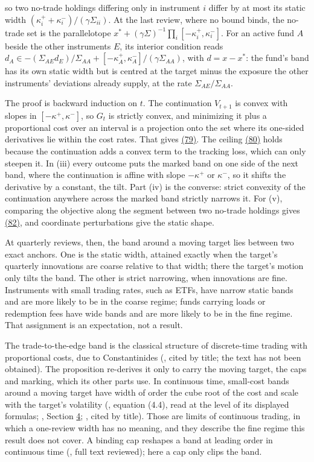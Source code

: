 \documentclass[11pt]{article}
\begin{document}
so two no-trade holdings differing only in instrument \(i\) differ by
at most its static width \((\kappa^+_i+\kappa^-_i)/(\gamma\Sigma_{ii})\). At the
last review, where no bound binds, the no-trade set is the
parallelotope \(x^*+(\gamma\Sigma)^{-1}\prod_i[-\kappa^+_i,\kappa^-_i]\). For an
active fund \(A\) beside the other instruments \(E\), its interior
condition reads
\(d_A\in-(\Sigma_{AE}d_E)/\Sigma_{AA}+[-\kappa^+_A,\kappa^-_A]/(\gamma\Sigma_{AA})\),
with \(d=x-x^*\): the fund's band has its own static width but is
centred at the target minus the exposure the other instruments'
deviations already supply, at the rate \(\Sigma_{AE}/\Sigma_{AA}\).

The proof is backward induction on \(t\). The continuation
\(V_{t+1}\) is convex with slopes in \([-\kappa^+,\kappa^-]\), so \(G_t\) is
strictly convex, and minimizing it plus a proportional cost over an
interval is a projection onto the set where its one-sided
derivatives lie within the cost rates. That gives \hyperref[eq:79]{(79)}. The ceiling
\hyperref[eq:80]{(80)} holds because the continuation adds a convex term to the
tracking loss, which can only steepen it. In (iii) every outcome puts
the marked band on one side of the next band, where the continuation
is affine with slope \(-\kappa^+\) or \(\kappa^-\), so it shifts the
derivative by a constant, the tilt. Part (iv) is the converse: strict
convexity of the continuation anywhere across the marked band
strictly narrows it. For (v), comparing the objective along the
segment between two no-trade holdings gives \hyperref[eq:82]{(82)}, and coordinate
perturbations give the static shape.

At quarterly reviews, then, the band around a moving target lies
between two exact anchors. One is the static width, attained exactly
when the target's quarterly innovations are coarse relative to that
width; there the target's motion only tilts the band. The other is
strict narrowing, when innovations are fine. Instruments with small
trading rates, such as ETFs, have narrow static bands and are more
likely to be in the coarse regime; funds carrying loads or
redemption fees have wide bands and are more likely to be in the
fine regime. That assignment is an expectation, not a result.

The trade-to-the-edge band is the classical structure of
discrete-time trading with proportional costs, due to Constantinides
(\cite{constantinides1979multiperiod}, cited by title; the text has not
been obtained). The proposition re-derives it only to carry the
moving target, the caps and marking, which its other parts use. In
continuous time, small-cost bands around a moving target have width
of order the cube root of the cost and scale with the target's
volatility (\cite{soner2013homogenization}, equation (4.4), read at the
level of its displayed formulas; \cite{muhlekarbe2017primer}, Section \hyperref[sec:4]{4};
\cite{martin2012optimal}, cited by title). Those are limits of continuous
trading, in which a one-review width has no meaning, and they describe
the fine regime this result does not cover. A binding cap reshapes a
band at leading order in continuous time (\cite{liu2013portfolio}, full
text reviewed); here a cap only clips the band.
\end{document}
